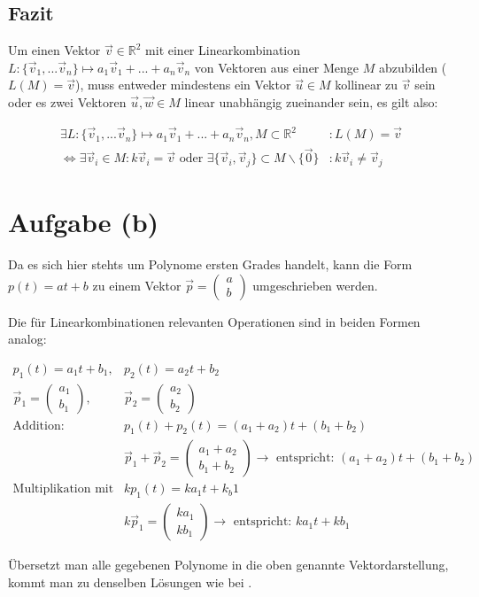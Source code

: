 \documentclass{article}
\newcommand*{\mtx}[1]{\begin{pmatrix}#1\end{pmatrix}}
\begin{document}
	\newpage

	\subsection{Fazit}
	Um einen Vektor $\vec{v} \in \mathbb{R}^2$ mit einer Linearkombination $L: \{\vec{v}_1, ...\vec{v}_n\} \mapsto a_1\vec{v}_1 + ... + a_n\vec{v}_n$ von Vektoren 
	aus einer Menge $M$ abzubilden ($L(M)=\vec{v}$), muss entweder mindestens ein Vektor $\vec{u} \in M$ 
	kollinear zu $\vec{v}$ sein oder es zwei Vektoren $\vec{u}, \vec{w} \in M$ linear 
	unabhängig zueinander sein, es gilt also:

	\begin{align*}
		\exists L: \{\vec{v}_1, ...\vec{v}_n\} \mapsto a_1\vec{v}_1 + ... + a_n\vec{v}_n, M\subset\mathbb{R}^2&: L(M)=\vec{v} \\
		\Leftrightarrow \exists\vec{v}_i\in M: k\vec{v}_i = \vec{v} 
		\text{ oder } \exists\{\vec{v}_i, \vec{v}_j\} \subset M\backslash\{\vec0\}&: k\vec{v}_i\neq\vec{v}_j
	\end{align*}

	\section{Aufgabe (b)}
	
	Da es sich hier stehts um Polynome ersten Grades handelt, kann die Form $p(t)=at+b$ zu einem Vektor $\vec{p}=\mtx{a\\b}$ umgeschrieben werden.

	Die für Linearkombinationen relevanten Operationen sind in beiden Formen analog:

	\begin{align*}
		p_1(t)=a_1t+b_1, & p_2(t)=a_2t+b_2\\
		\vec{p}_1=\mtx{a_1\\b_1}, & \vec{p}_2=\mtx{a_2\\b_2}\\
		\text{Addition: }& p_1(t)+p_2(t) = (a_1+a_2)t + (b_1+b_2)\\
						 & \vec{p}_1+\vec{p}_2 = \mtx{a_1+a_2 \\ b_1+b_2} \rightarrow \text{ entspricht: } (a_1+a_2)t + (b_1+b_2)\\
		\text{Multiplikation mit skalarem Wert: }& kp_1(t) = ka_1t+k_b1\\
												 & k\vec{p}_1 = \mtx{ka_1\\kb_1} \rightarrow \text{ entspricht: } ka_1t+kb_1
	\end{align*}
	
	Übersetzt man alle gegebenen Polynome in die oben genannte Vektordarstellung, kommt man zu denselben Lösungen wie bei .
\end{document}
